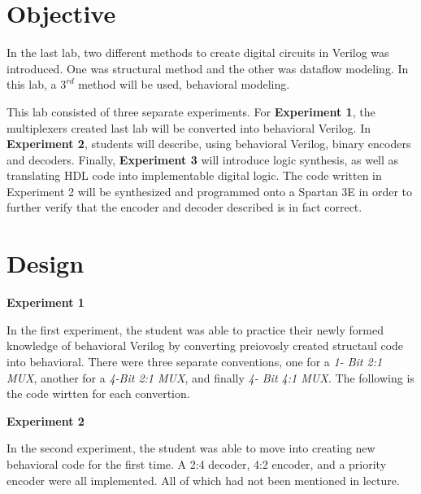 \documentclass[a4paper,12pt]{article}
\begin{document}
\section*{Objective}

\hspace{15pt}In the last lab, two different methods to create digital circuits in Verilog was introduced. One was
structural method and the other was dataflow modeling. In this lab, a $3^{rd}$ method will be used, behavioral modeling.

This lab consisted of three separate experiments. For \textbf{Experiment 1}, the multiplexers created last lab will
be converted into behavioral Verilog. In \textbf{Experiment 2}, students will describe, using behavioral Verilog, binary encoders and decoders. Finally, \textbf{Experiment 3} will introduce logic synthesis, as well as translating HDL code into implementable digital logic. The code written in Experiment 2 will be synthesized and programmed onto a Spartan 3E in order to further verify that the encoder and decoder described is in fact correct.

\section*{Design}

\textbf{Experiment 1}

  \vspace{15pt}In the first experiment, the student was able to practice their newly formed
  knowledge of behavioral Verilog by converting preiovosly created structaul code
  into behavioral. There were three separate conventions, one for a \textit{1-
  Bit 2:1 MUX}, another for a \textit{4-Bit 2:1 MUX}, and finally \textit{4-
  Bit 4:1 MUX.} The following is the code wirtten for each convertion.

  

  

  

  \hspace{-15pt}\textbf{Experiment 2}

  \vspace{15pt}In the second experiment, the student was able to move into creating
  new behavioral code for the first time. A 2:4 decoder, 4:2 encoder, and a priority
  encoder were all implemented. All of which had not been mentioned in lecture.
\end{document}
